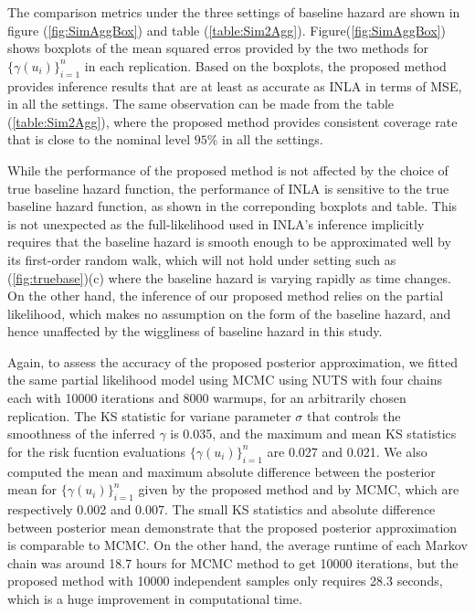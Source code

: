 \documentclass[ba]{imsart}
\begin{document}
The comparison metrics under the three settings of baseline hazard are shown in figure (\ref{fig:SimAggBox}) and table (\ref{table:Sim2Agg}). Figure(\ref{fig:SimAggBox}) shows boxplots of the mean squared erros provided by the two methods for $\{\gamma(u_i)\}_{i=1}^n$ in each replication. Based on the boxplots, the proposed method provides inference results that are at least as accurate as INLA in terms of MSE, in all the settings. The same observation can be made from the table (\ref{table:Sim2Agg}), where the proposed method provides consistent coverage rate that is close to the nominal level $95\%$ in all the settings. 

While the performance of the proposed method is not affected by the choice of true baseline hazard function, the performance of INLA is sensitive to the true baseline hazard function, as shown in the correponding boxplots and table. This is not unexpected as the full-likelihood used in INLA's inference implicitly requires that the baseline hazard is smooth enough to be approximated well by its first-order random walk, which will not hold under setting such as (\ref{fig:truebase})(c) where the baseline hazard is varying rapidly as time changes. On the other hand, the inference of our proposed method relies on the partial likelihood, which makes no assumption on the form of the baseline hazard, and hence unaffected by the wiggliness of baseline hazard in this study. 

Again, to assess the accuracy of the proposed posterior approximation, we fitted the same partial likelihood model using MCMC using NUTS with four chains each with 10000 iterations and 8000 warmups, for an arbitrarily chosen replication. The KS statistic for variane parameter $\sigma$ that controls the smoothness of the inferred $\gamma$ is 0.035, and the maximum and mean KS statistics for the risk fucntion evaluations $\{\gamma(u_i)\}_{i=1}^n$ are 0.027 and 0.021. We also computed the mean and maximum absolute difference between the posterior mean for $\{\gamma(u_i)\}_{i=1}^n$ given by the proposed method and by MCMC, which are respectively 0.002 and 0.007. The small KS statistics and absolute difference between posterior mean demonstrate that the proposed posterior approximation is comparable to MCMC. On the other hand, the average runtime of each Markov chain was around 18.7 hours for MCMC method to get 10000 iterations, but the proposed method with 10000 independent samples only requires 28.3 seconds, which is a huge improvement in computational time.
\end{document}
